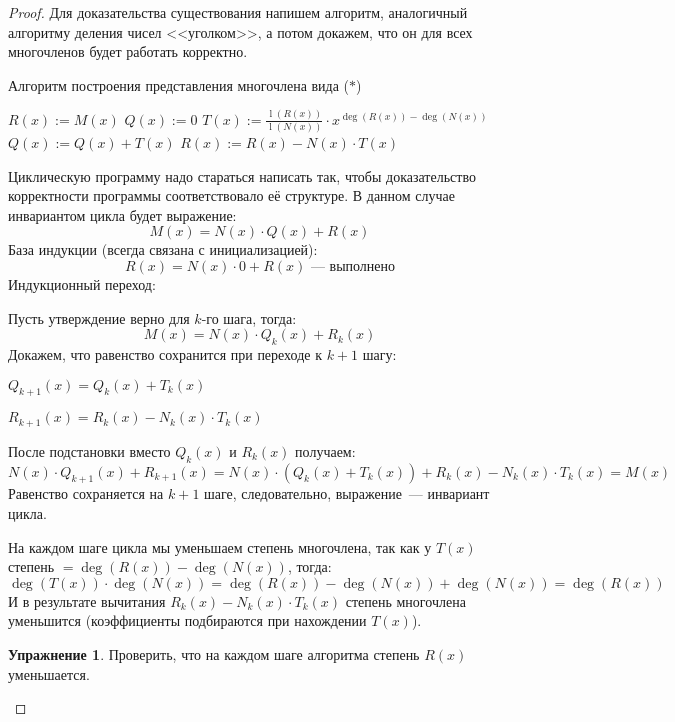 \documentclass[russian]{lecture-notes}
\theoremstyle{definition}
\newtheorem*{exercise}{Упражнение}
\DeclareMathOperator{\Deg}{deg}
\newcommand{\D}[1]{\Deg(#1)}
\DeclareMathOperator{\Lid}{l}
\newcommand{\lid}[1]{\Lid(#1)}
\begin{document}
	\begin{proof}
		Для доказательства существования напишем алгоритм, аналогичный алгоритму деления чисел <<уголком>>, а потом докажем, что он для всех многочленов будет работать корректно.
		\begin{algorithm}[H]
			\caption{Алгоритм построения представления многочлена вида ($\ast$)}\label{alg:mnogoch}
			\begin{algorithmic}[1]
				\State $R(x) := M(x)$
				\State $Q(x) := 0$
				\Statex
				\While{$\D{R(x)} \geqslant \D{N(x)}$}
				\State $\displaystyle T(x) := \frac{\lid{R(x)}}{\lid{N(x)}} \cdot x^{\D{R(x)} - \D{N(x)}}$
				\Comment{Текущее частное}
				\State $Q(x) := Q(x) + T(x)$
				\State $R(x) := R(x) - N(x) \cdot T(x)$
				\EndWhile
				\Statex
			\end{algorithmic}
		\end{algorithm}
	
		\begin{note}
			Циклическую программу надо стараться написать так, чтобы доказательство корректности программы соответствовало её структуре. В данном случае инвариантом цикла будет выражение:
			\[
				M(x) = N(x) \cdot Q(x) + R(x)
			\]
			База индукции (всегда связана с инициализацией):
			\[
				R(x) = N(x) \cdot 0 + R(x) \text{~--- выполнено}
			\]
			Индукционный переход:
			
			\noindent Пусть утверждение верно для $k$-го шага, тогда:
			\[
				M(x) = N(x) \cdot Q_k(x) + R_k(x)
			\]
			Докажем, что равенство сохранится при переходе к $k+1$ шагу:
			
			$Q_{k+1}(x) = Q_k(x) + T_k(x)$
			
			$R_{k+1}(x) = R_k(x) - N_k(x) \cdot T_k(x)$
			
			\noindent После подстановки вместо $Q_k(x)$ и $R_k(x)$ получаем:
			\[
				 N(x) \cdot Q_{k+1}(x) + R_{k+1}(x) =  N(x) \cdot( Q_k(x) + T_k(x)) +R_k(x) - N_k(x) \cdot T_k(x) = M(x)
			\]
			Равенство сохраняется на $k+1$ шаге, следовательно, выражение~--- инвариант цикла.
		\end{note}
	
		На каждом шаге цикла мы уменьшаем степень многочлена, так как у $T(x)$ степень $= \D{R(x)} - \D{N(x)}$, тогда:
		\[
			\D{T(x)} \cdot \D{N(x)} = \D{R(x)} - \D{N(x)} + \D{N(x)} = \D{R(x)}
		\]
		И в результате вычитания $R_k(x) - N_k(x) \cdot T_k(x)$ степень многочлена уменьшится (коэффициенты подбираются при нахождении $T(x)$).
		
		\begin{exercise}
			Проверить, что на каждом шаге алгоритма степень $R(x)$ уменьшается.
		\end{exercise}
		

\end{proof}
\end{document}
